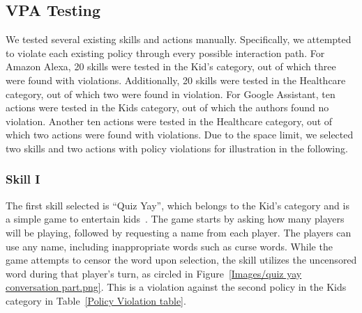 \documentclass{article}
\begin{document}
\subsection{VPA Testing}

We tested several existing skills and actions manually. Specifically, we attempted to violate each existing policy through every possible interaction path. For Amazon Alexa, 20 skills were tested in the Kid's category, out of which three were found with violations. Additionally, 20 skills were tested in the Healthcare category, out of which two were found in violation. For Google Assistant, ten actions were tested in the Kids category, out of which the authors found no violation. Another ten actions were tested in the Healthcare category, out of which two actions were found with violations. Due to the space limit, we selected two skills and two actions with policy violations for illustration in the following.

\subsubsection{Skill I}

The first skill selected is ``Quiz Yay'', which belongs to the Kid's category and is a simple game to entertain kids~\cite{QuizYay}. %
The game starts by asking how many players will be playing, followed by requesting a name from each player. The players can use any name, including inappropriate words such as curse words. While the game attempts to censor the word upon selection, the skill utilizes the uncensored word during that player's turn, as circled in Figure~\ref{Images/quiz yay conversation part.png}. %
This is a violation against the second policy in the Kids category in Table~\ref{Policy Violation table}.
\end{document}
